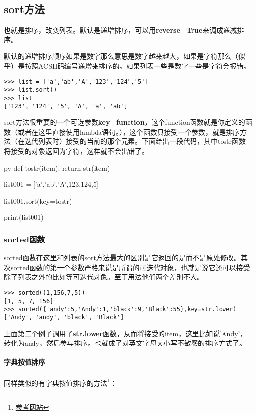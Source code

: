 \documentclass[12pt,oneside]{book}
\begin{document}
\begin{common-format}
\subsection{sort方法}
也就是排序，改变列表。默认是递增排序，可以用\textbf{reverse=True}来调成递减排序。

默认的递增排序顺序如果是数字那么意思是数字越来越大，如果是字符那么（似乎）是按照ACSII码编号递增来排序的。如果列表一些是数字一些是字符会报错。
\begin{Verbatim}
>>> list = ['a','ab','A','123','124','5']
>>> list.sort()
>>> list
['123', '124', '5', 'A', 'a', 'ab']
\end{Verbatim}

sort方法很重要的一个可选参数\textbf{key=function}，这个function函数就是你定义的函数（或者在这里直接使用lambda语句。），这个函数只接受一个参数，就是排序方法（在迭代列表时）接受的当前的那个元素。下面给出一段代码，其中tostr函数将接受的对象返回为字符，这样就不会出错了。
\begin{xverbatim}[129]{py}
def tostr(item):
    return str(item)

list001 = ['a','ab','A',123,124,5]

list001.sort(key=tostr)

print(list001)
\end{xverbatim}

\subsubsection{sorted函数}
sorted函数在这里和列表的sort方法最大的区别是它返回的是而不是原处修改。其次sorted函数的第一个参数严格来说是所谓的可迭代对象，也就是说它还可以接受除了列表之外的比如等可迭代对象。至于用法他们两个差别不大。

\begin{Verbatim}
>>> sorted((1,156,7,5))
[1, 5, 7, 156]
>>> sorted({'andy':5,'Andy':1,'black':9,'Black':55},key=str.lower)
['Andy', 'andy', 'black', 'Black']
\end{Verbatim}

上面第二个例子调用了\textbf{str.lower}函数，从而将接受的item，这里比如说'Andy'，转化为andy，然后参与排序。也就成了对英文字母大小写不敏感的排序方式了。

\paragraph{字典按值排序}
同样类似的有字典按值排序的方法\footnote{\href{http://www.cnpythoner.com/post/266.html}{参考网站}}：


\end{common-format}
\end{document}
